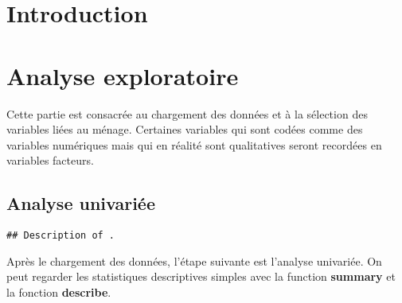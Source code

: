 \documentclass[11pt,a4paper, x11names]{article}\usepackage[]{graphicx}\usepackage[]{color}
\makeatletter
\newenvironment{kframe}{%
 \def\at@end@of@kframe{}%
 \ifinner\ifhmode%
  \def\at@end@of@kframe{\end{minipage}}%
  \begin{minipage}{\columnwidth}%
 \fi\fi%
 \def\FrameCommand##1{\hskip\@totalleftmargin \hskip-\fboxsep
 \colorbox{shadecolor}{##1}\hskip-\fboxsep
     \hskip-\linewidth \hskip-\@totalleftmargin \hskip\columnwidth}%
 \MakeFramed {\advance\hsize-\width
   \@totalleftmargin\z@ \linewidth\hsize
   \@setminipage}}%
 {\par\unskip\endMakeFramed%
 \at@end@of@kframe}
\newenvironment{knitrout}{}{} %
\makeatother
\begin{document}

\tableofcontents
\begin{abstract}
\end{abstract}
\section{Introduction}







\section{Analyse exploratoire}
Cette partie est consacrée au chargement des données et à la sélection des variables 
liées au ménage. Certaines variables qui sont codées comme des variables numériques mais qui en réalité sont qualitatives seront recordées en variables facteurs.  
\subsection{Analyse univariée}
\begin{knitrout}
\color{fgcolor}\begin{kframe}
\begin{verbatim}
## Description of .
\end{verbatim}
\end{kframe}
\end{knitrout}
Après le chargement des données, l'étape suivante est l'analyse univariée. 
On peut regarder les statistiques descriptives simples avec la function \textbf{summary} et la fonction \textbf{describe}.
\end{document}
